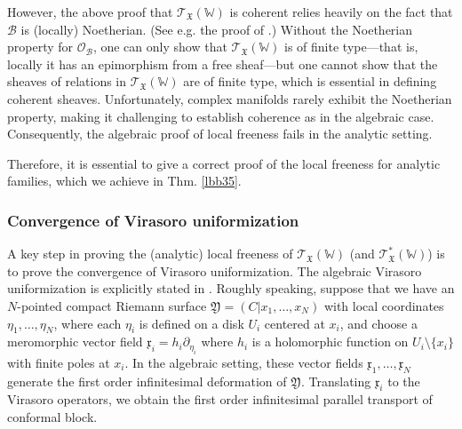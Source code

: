 \documentclass[11pt,b5paper,notitlepage]{article}
\theoremstyle{definition}
\theoremstyle{plain}
\newcommand{\scr}{\mathscr}
\newcommand{\xk}{\mathfrak x}
\newcommand{\Wbb}{\mathbb W}
\newcommand{\<}{\left\langle}
\renewcommand{\>}{\right\rangle}
\newcommand{\MO}{\mathcal{O}}
\newcommand{\MB}{\mathcal{B}}
\newcommand{\fx}{\mathfrak{X}}
\newcommand{\fy}{\mathfrak{Y}}
\numberwithin{equation}{section}
\begin{document}
However, the above proof that $\scr T_\fx(\Wbb)$ is coherent relies heavily on the fact that $\MB$ is (locally) Noetherian. (See e.g. the proof of \cite[Thm. 6.2.1]{NT-P1_conformal_blocks}.) Without the Noetherian property for $\MO_\MB$, one can only show that $\scr T_\fx(\Wbb)$ is of finite type---that is, locally it has an epimorphism from a free sheaf---but one cannot show that the sheaves of relations in $\scr T_\fx(\Wbb)$ are of finite type, which is essential in defining coherent sheaves. Unfortunately, complex manifolds rarely exhibit the Noetherian property, making it challenging to establish coherence as in the algebraic case. Consequently, the algebraic proof of local freeness fails in the analytic setting. 

Therefore, it is essential to give a correct proof of the local freeness for analytic families, which we achieve in Thm. \ref{lbb35}.



\subsubsection*{Convergence of Virasoro uniformization}

A key step in proving the (analytic) local freeness of $\scr T_\fx(\Wbb)$ (and $\scr T_\fx^*(\Wbb)$) is to prove the convergence of Virasoro uniformization. The algebraic Virasoro uniformization is explicitly stated in \cite[Ch. 17]{FB04}. Roughly speaking, suppose that we have an $N$-pointed compact Riemann surface $\fy=(C|x_1,\dots,x_N)$ with local coordinates $\eta_1,\dots,\eta_N$, where each $\eta_i$ is defined on a disk $U_i$ centered at $x_i$, and choose a meromorphic vector field $\xk_i=h_i\partial_{\eta_i}$ where $h_i$ is a holomorphic function on $U_i\setminus\{x_i\}$ with finite poles at $x_i$. In the algebraic setting, these vector fields $\xk_1,\dots,\xk_N$ generate the first order infinitesimal deformation of $\fy$. Translating $\xk_i$ to the Virasoro operators, we obtain the first order infinitesimal parallel transport of conformal block.
\end{document}
